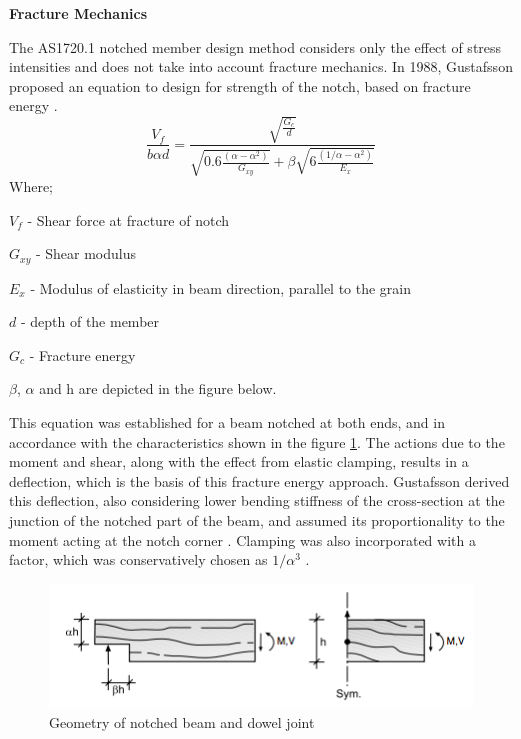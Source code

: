 \documentclass[11pt,a4paper]{article}
\numberwithin{equation}{subsection}
\begin{document}
	\vspace*{\baselineskip}
	
	\noindent 	
	\textbf{Fracture Mechanics}\par 	 	
	\noindent 	
	The AS1720.1 notched member design method considers only the effect of stress intensities and does not take into account fracture mechanics. In 1988, Gustafsson proposed an equation to design for strength of the notch, based on fracture energy \cite{jockwer_state---art_2013,gustafsson_study_1988}.  	 \begin{equation} 
	\dfrac{V_{f}}{b\alpha d} = \dfrac{\sqrt{\frac{G_{c}}{d}}}{\sqrt{0.6\frac{(\alpha-\alpha^{2})}{G_{xy}}}+\beta\sqrt{6\frac{(1/\alpha-\alpha^2)}{E_{x}}}} \end{equation} 		 		 		
	\noindent 		
	Where; \par 	
	$ V_{f} $ - Shear force at fracture of notch\par 	
	$G_{xy}$ - Shear modulus\par  	
	$ E_{x} $ - Modulus of elasticity in beam direction, parallel to the grain\par 	
	$ d $ - depth of the member\par  	
	$ G_{c} $ - Fracture energy\par  	
	$ \beta $, 
	$ \alpha $ and h are depicted in the figure below. \par 		 	
	\vspace*{\baselineskip} 	 	
	\noindent 	This equation was established for a beam notched at both ends, and in accordance with the characteristics shown in the figure \ref{fig:Gust}. The actions due to the moment and shear, along with the effect from elastic clamping, results in a deflection, which is the basis of this fracture energy approach. Gustafsson derived this deflection, also considering lower bending stiffness of the cross-section at the junction of the notched part of the beam, and assumed its proportionality to the moment acting at the notch corner \cite{jockwer_state---art_2013}. Clamping was also incorporated with a factor, which was conservatively chosen as $1/\alpha^{3}$ \cite{gustafsson_study_1988}.   
		 	 		
		\begin{figure}[h] 			\includegraphics[scale=0.9]{Geom_notched_beam_dowl} 			\caption{Geometry of notched beam and dowel joint \cite{serrano_fracture_2007}} 	
		\label{fig:Gust}	
		\end{figure} 	
	 		 	
\end{document}
